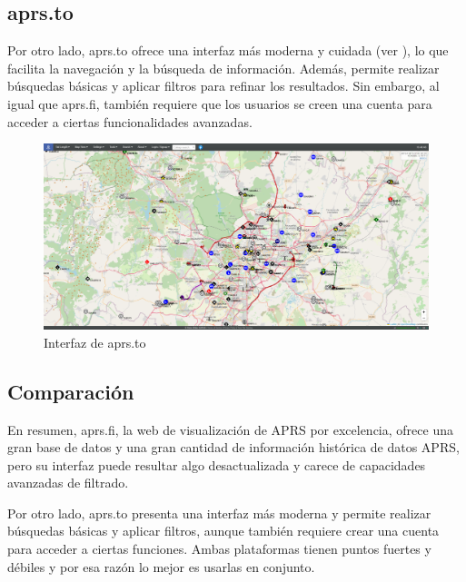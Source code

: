 \subsection{aprs.to}

Por otro lado, aprs.to ofrece una interfaz más moderna y cuidada (ver ), lo que facilita la navegación y la búsqueda de información. Además, permite realizar búsquedas básicas y aplicar filtros para refinar los resultados. Sin embargo, al igual que aprs.fi, también requiere que los usuarios se creen una cuenta para acceder a ciertas funcionalidades avanzadas.

\begin{figure}[h]
    \centering
    \includegraphics[width=1\textwidth]{Imagenes/Chapter_2/aprs-to.png}
    \caption{Interfaz de aprs.to}
    \label{fig:aprs-to}
\end{figure}

\FloatBarrier

\subsection{Comparación}

En resumen, aprs.fi, la web de visualización de APRS por excelencia, ofrece una gran base de datos y una gran cantidad de información histórica de datos APRS, pero su interfaz puede resultar algo desactualizada y carece de capacidades avanzadas de filtrado. 

Por otro lado, aprs.to presenta una interfaz más moderna y permite realizar búsquedas básicas y aplicar filtros, aunque también requiere crear una cuenta para acceder a ciertas funciones. Ambas plataformas tienen puntos fuertes y débiles y por esa razón lo mejor es usarlas en conjunto.